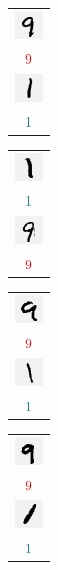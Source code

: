 \documentclass[11pt, justified]{tufte-book}
\theoremstyle{definition}
\begin{document}
        \vspace{-0.25cm}
        \begin{figure}
            \centering
          \begin{tabular}{c}\includegraphics[width=0.75cm]{example-mnist/mnist-trn-00}\\$\red{9}$\\\includegraphics[width=0.75cm]{example-mnist/mnist-trn-10}\\$\cya{1}$\end{tabular}%
          \begin{tabular}{c}\includegraphics[width=0.75cm]{example-mnist/mnist-trn-01}\\$\cya{1}$\\\includegraphics[width=0.75cm]{example-mnist/mnist-trn-11}\\$\red{9}$\end{tabular}%
          \begin{tabular}{c}\includegraphics[width=0.75cm]{example-mnist/mnist-trn-02}\\$\red{9}$\\\includegraphics[width=0.75cm]{example-mnist/mnist-trn-12}\\$\cya{1}$\end{tabular}%
          \begin{tabular}{c}\includegraphics[width=0.75cm]{example-mnist/mnist-trn-03}\\$\red{9}$\\\includegraphics[width=0.75cm]{example-mnist/mnist-trn-13}\\$\cya{1}$\end{tabular}%

\end{figure}
\end{document}
